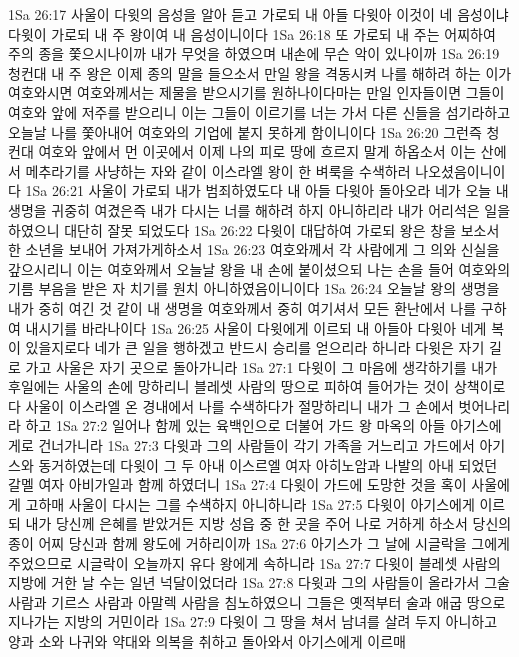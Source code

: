 1Sa 26:17  사울이 다윗의 음성을 알아 듣고 가로되 내 아들 다윗아 이것이 네 음성이냐 다윗이 가로되 내 주 왕이여 내 음성이니이다
1Sa 26:18  또 가로되 내 주는 어찌하여 주의 종을 쫓으시나이까 내가 무엇을 하였으며 내손에 무슨 악이 있나이까
1Sa 26:19  청컨대 내 주 왕은 이제 종의 말을 들으소서 만일 왕을 격동시켜 나를 해하려 하는 이가 여호와시면 여호와께서는 제물을 받으시기를 원하나이다마는 만일 인자들이면 그들이 여호와 앞에 저주를 받으리니 이는 그들이 이르기를 너는 가서 다른 신들을 섬기라하고 오늘날 나를 쫓아내어 여호와의 기업에 붙지 못하게 함이니이다
1Sa 26:20  그런즉 청컨대 여호와 앞에서 먼 이곳에서 이제 나의 피로 땅에 흐르지 말게 하옵소서 이는 산에서 메추라기를 사냥하는 자와 같이 이스라엘 왕이 한 벼룩을 수색하러 나오셨음이니이다
1Sa 26:21  사울이 가로되 내가 범죄하였도다 내 아들 다윗아 돌아오라 네가 오늘 내 생명을 귀중히 여겼은즉 내가 다시는 너를 해하려 하지 아니하리라 내가 어리석은 일을 하였으니 대단히 잘못 되었도다
1Sa 26:22  다윗이 대답하여 가로되 왕은 창을 보소서 한 소년을 보내어 가져가게하소서
1Sa 26:23  여호와께서 각 사람에게 그 의와 신실을 갚으시리니 이는 여호와께서 오늘날 왕을 내 손에 붙이셨으되 나는 손을 들어 여호와의 기름 부음을 받은 자 치기를 원치 아니하였음이니이다
1Sa 26:24  오늘날 왕의 생명을 내가 중히 여긴 것 같이 내 생명을 여호와께서 중히 여기셔서 모든 환난에서 나를 구하여 내시기를 바라나이다
1Sa 26:25  사울이 다윗에게 이르되 내 아들아 다윗아 네게 복이 있을지로다 네가 큰 일을 행하겠고 반드시 승리를 얻으리라 하니라 다윗은 자기 길로 가고 사울은 자기 곳으로 돌아가니라
1Sa 27:1  다윗이 그 마음에 생각하기를 내가 후일에는 사울의 손에 망하리니 블레셋 사람의 땅으로 피하여 들어가는 것이 상책이로다 사울이 이스라엘 온 경내에서 나를 수색하다가 절망하리니 내가 그 손에서 벗어나리라 하고
1Sa 27:2  일어나 함께 있는 육백인으로 더불어 가드 왕 마옥의 아들 아기스에게로 건너가니라
1Sa 27:3  다윗과 그의 사람들이 각기 가족을 거느리고 가드에서 아기스와 동거하였는데 다윗이 그 두 아내 이스르엘 여자 아히노암과 나발의 아내 되었던 갈멜 여자 아비가일과 함께 하였더니
1Sa 27:4  다윗이 가드에 도망한 것을 혹이 사울에게 고하매 사울이 다시는 그를 수색하지 아니하니라
1Sa 27:5  다윗이 아기스에게 이르되 내가 당신께 은혜를 받았거든 지방 성읍 중 한 곳을 주어 나로 거하게 하소서 당신의 종이 어찌 당신과 함께 왕도에 거하리이까
1Sa 27:6  아기스가 그 날에 시글락을 그에게 주었으므로 시글락이 오늘까지 유다 왕에게 속하니라
1Sa 27:7  다윗이 블레셋 사람의 지방에 거한 날 수는 일년 넉달이었더라
1Sa 27:8  다윗과 그의 사람들이 올라가서 그술 사람과 기르스 사람과 아말렉 사람을 침노하였으니 그들은 옛적부터 술과 애굽 땅으로 지나가는 지방의 거민이라
1Sa 27:9  다윗이 그 땅을 쳐서 남녀를 살려 두지 아니하고 양과 소와 나귀와 약대와 의복을 취하고 돌아와서 아기스에게 이르매
